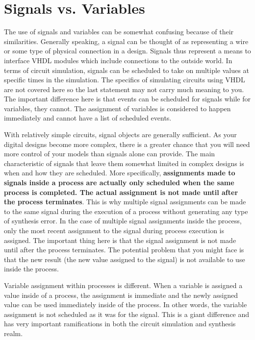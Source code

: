 \section{Signals vs. Variables}
The use of signals and variables can be somewhat confusing because of their similarities. Generally speaking, a signal can be thought of as representing a wire or some type of physical connection in a design. Signals thus represent a means to interface VHDL modules which include connections to the outside world. In terms of circuit simulation, signals can be scheduled to take on multiple values at specific times in the simulation. The specifics of simulating circuits using VHDL are not covered here so the last statement may not carry much meaning to you. The important difference here is that events can be scheduled for signals while for variables, they cannot. The assignment of variables is considered to happen immediately and cannot have a list of scheduled events.

With relatively simple circuits, signal objects are generally sufficient. As your digital designs become more complex, there is a greater chance that you will need more control of your models than signals alone can provide. The main characteristic of signals that leave them somewhat limited in complex designs is when and how they are scheduled. More specifically, \textbf{assignments made to signals inside a process are actually only scheduled when the same process is completed. The actual assignment is not made until after the process terminates}. This is why multiple signal assignments can be made to the same signal during the execution of a process without generating any type of synthesis error. In the case of multiple signal assignments inside the process, only the most recent assignment to the signal during process execution is assigned. The important thing here is that the signal assignment is not made until after the process terminates. The potential problem that you might face is that the new result (the new value assigned to the signal) is not available to use inside the process.

Variable assignment within processes is different. When a variable is assigned a value inside of a process, the assignment is immediate and the newly assigned value can be used immediately inside of the process. In other words, the variable assignment is not scheduled as it was for the signal. This is a giant difference and has very important ramifications in both the circuit simulation and synthesis realm.

